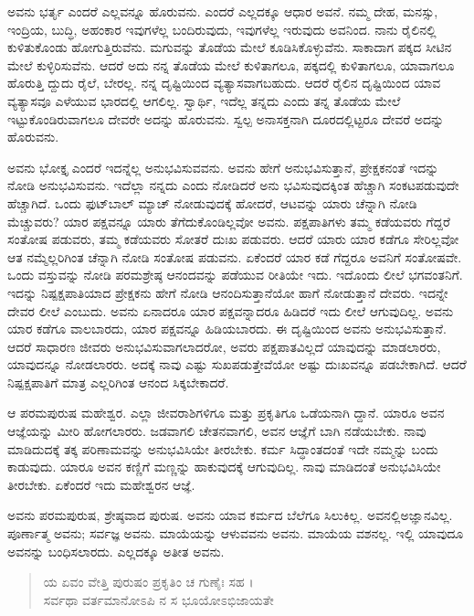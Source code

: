ಅವನು ಭರ್ತೃ ಎಂದರೆ ಎಲ್ಲವನ್ನೂ ಹೊರುವನು. ಎಂದರೆ ಎಲ್ಲದಕ್ಕೂ ಆಧಾರ ಅವನೆ. ನಮ್ಮ ದೇಹ, ಮನಸ್ಸು, ಇಂದ್ರಿಯ, ಬುದ್ಧಿ, ಅಹಂಕಾರ ಇವುಗಳೆಲ್ಲ ಬಂದಿರುವುದು, ಇವುಗಳೆಲ್ಲ ಇರುವುದು ಅವನಿಂದ. ನಾನು ರೈಲಿನಲ್ಲಿ ಕುಳಿತುಕೊಂಡು ಹೋಗುತ್ತಿರುವೆನು. ಮಗುವನ್ನು ತೊಡೆಯ ಮೇಲೆ ಕೂಡಿಸಿಕೊಳ್ಳುವೆನು. ಸಾಕಾದಾಗ ಪಕ್ಕದ ಸೀಟಿನ ಮೇಲೆ ಕುಳ್ಳಿರಿಸುವೆನು. ಆದರೆ ಅದು ನನ್ನ ತೊಡೆಯ ಮೇಲೆ ಕುಳಿತಾಗಲೂ, ಪಕ್ಕದಲ್ಲಿ ಕುಳಿತಾಗಲೂ, ಯಾವಾಗಲೂ ಹೊರುತ್ತಿ ದ್ದುದು ರೈಲೆ, ಬೇರಲ್ಲ. ನನ್ನ ದೃಷ್ಟಿಯಿಂದ ವ್ಯತ್ಯಾಸವಾಗಬಹುದು. ಆದರೆ ರೈಲಿನ ದೃಷ್ಟಿಯಿಂದ ಯಾವ ವ್ಯತ್ಯಾಸವೂ ಎಳೆಯುವ ಭಾರದಲ್ಲಿ ಆಗಲಿಲ್ಲ. ಸ್ವಾರ್ಥಿ, ಇದೆಲ್ಲ ತನ್ನದು ಎಂದು ತನ್ನ ತೊಡೆಯ ಮೇಲೆ ಇಟ್ಟುಕೊಂಡಿರುವಾಗಲೂ ದೇವರೇ ಅದನ್ನು ಹೊರುವನು. ಸ್ವಲ್ಪ ಅನಾಸಕ್ತನಾಗಿ ದೂರದಲ್ಲಿಟ್ಟರೂ ದೇವರೆ ಅದನ್ನು ಹೊರುವನು.

ಅವನು ಭೋಕ್ತೃ ಎಂದರೆ ಇದನ್ನೆಲ್ಲ ಅನುಭವಿಸುವವನು. ಅವನು ಹೇಗೆ ಅನುಭವಿಸುತ್ತಾನೆ, ಪ್ರೇಕ್ಷಕನಂತೆ ಇದನ್ನು ನೋಡಿ ಅನುಭವಿಸುವನು. ಇದೆಲ್ಲಾ ನನ್ನದು ಎಂದು ನೋಡಿದರೆ ಅನು ಭವಿಸುವುದಕ್ಕಿಂತ ಹೆಚ್ಚಾಗಿ ಸಂಕಟಪಡುವುದೇ ಹೆಚ್ಚಾಗಿದೆ. ಒಂದು ಫುಟ್​ಬಾಲ್ ಮ್ಯಾಚ್ ನೋಡುವುದಕ್ಕೆ ಹೋದರೆ, ಆಟವನ್ನು ಯಾರು ಚೆನ್ನಾಗಿ ನೋಡಿ ಮೆಚ್ಚುವರು? ಯಾರ ಪಕ್ಷವನ್ನೂ ಯಾರು ತೆಗೆದುಕೊಂಡಿಲ್ಲವೋ ಅವನು. ಪಕ್ಷಪಾತಿಗಳು ತಮ್ಮ ಕಡೆಯವರು ಗೆದ್ದರೆ ಸಂತೋಷ ಪಡುವರು, ತಮ್ಮ ಕಡೆಯವರು ಸೋತರೆ ದುಃಖ ಪಡುವರು. ಆದರೆ ಯಾರು ಯಾರ ಕಡೆಗೂ ಸೇರಿಲ್ಲವೋ ಆತ ನಮ್ಮೆಲ್ಲರಿಗಿಂತ ಚೆನ್ನಾಗಿ ನೋಡಿ ಸಂತೋಷ ಪಡುವನು. ಏಕೆಂದರೆ ಯಾರ ಕಡೆ ಗೆದ್ದರೂ ಅವನಿಗೆ ಸಂತೋಷವೇ. ಒಂದು ವಸ್ತುವನ್ನು ನೋಡಿ ಪರಮಶ್ರೇಷ್ಠ ಆನಂದವನ್ನು ಪಡೆಯುವ ರೀತಿಯೇ ಇದು. ಇದೊಂದು ಲೀಲೆ ಭಗವಂತನಿಗೆ. ಇದನ್ನು ನಿಷ್ಪಕ್ಷಪಾತಿಯಾದ ಪ್ರೇಕ್ಷಕನು ಹೇಗೆ ನೋಡಿ ಆನಂದಿಸುತ್ತಾನೆಯೋ ಹಾಗೆ ನೋಡುತ್ತಾನೆ ದೇವರು. ಇದನ್ನೇ ದೇವರ ಲೀಲೆ ಎಂಬುದು. ಅವನು ಏನಾದರೂ ಯಾರ ಪಕ್ಷವನ್ನಾದರೂ ಹಿಡಿದರೆ ಇದು ಲೀಲೆ ಆಗುವುದಿಲ್ಲ. ಅವನು ಯಾರ ಕಡೆಗೂ ವಾಲಬಾರದು, ಯಾರ ಪಕ್ಷವನ್ನೂ ಹಿಡಿಯಬಾರದು. ಈ ದೃಷ್ಟಿಯಿಂದ ಅವನು ಅನುಭವಿಸುತ್ತಾನೆ. ಆದರೆ ಸಾಧಾರಣ ಜೀವರು ಅನುಭವಿಸುವಾಗಲಾದರೋ, ಅವರು ಪಕ್ಷಪಾತವಿಲ್ಲದೆ ಯಾವುದನ್ನು ಮಾಡಲಾರರು, ಯಾವುದನ್ನೂ ನೋಡಲಾರರು. ಅದಕ್ಕೆ ನಾವು ಎಷ್ಟು ಸುಖಪಡುತ್ತೇವೆಯೋ ಅಷ್ಟು ದುಃಖವನ್ನೂ ಪಡಬೇಕಾಗಿದೆ. ಆದರೆ ನಿಷ್ಪಕ್ಷಪಾತಿಗೆ ಮಾತ್ರ ಎಲ್ಲರಿಗಿಂತ ಆನಂದ ಸಿಕ್ಕಬೇಕಾದರೆ.

ಆ ಪರಮಪುರುಷ ಮಹೇಶ್ವರ. ಎಲ್ಲಾ ಜೀವರಾಶಿಗಳಿಗೂ ಮತ್ತು ಪ್ರಕೃತಿಗೂ ಒಡೆಯನಾಗಿ ದ್ದಾನೆ. ಯಾರೂ ಅವನ ಆಜ್ಞೆಯನ್ನು ಮೀರಿ ಹೋಗಲಾರರು. ಜಡವಾಗಲಿ ಚೇತನವಾಗಲಿ, ಅವನ ಆಜ್ಞೆಗೆ ಬಾಗಿ ನಡೆಯಬೇಕು. ನಾವು ಮಾಡಿದುದಕ್ಕೆ ತಕ್ಕ ಪರಿಣಾಮವನ್ನು ಅನುಭವಿಸಿಯೇ ತೀರಬೇಕು. ಕರ್ಮ ಸಿದ್ಧಾಂತದಂತೆ ಇದೇ ನಮ್ಮನ್ನು ಬಂದು ಕಾಡುವುದು. ಯಾರೂ ಅವನ ಕಣ್ಣಿಗೆ ಮಣ್ಣನ್ನು ಹಾಕುವುದಕ್ಕೆ ಆಗುವುದಿಲ್ಲ. ನಾವು ಮಾಡಿದಂತೆ ಅನುಭವಿಸಿಯೇ ತೀರಬೇಕು. ಏಕೆಂದರೆ ಇದು ಮಹೇಶ್ವರನ ಆಜ್ಞೆ.

ಅವನು ಪರಮಪುರುಷ, ಶ್ರೇಷ್ಠವಾದ ಪುರುಷ. ಅವನು ಯಾವ ಕರ್ಮದ ಬೆಲೆಗೂ ಸಿಲುಕಿಲ್ಲ. ಅವನಲ್ಲಿಅಜ್ಞಾನವಿಲ್ಲ. ಪೂರ್ಣಾತ್ಮ ಅವನು; ಸರ್ವಜ್ಞ ಅವನು. ಮಾಯೆಯನ್ನು ಆಳುವವನು ಅವನು. ಮಾಯೆಯ ವಶನಲ್ಲ. ಇಲ್ಲಿ ಯಾವುದೂ ಅವನನ್ನು ಬಂಧಿಸಲಾರದು. ಎಲ್ಲದಕ್ಕೂ ಅತೀತ ಅವನು.

\begin{verse}
ಯ ಏವಂ ವೇತ್ತಿ ಪುರುಷಂ ಪ್ರಕೃತಿಂ ಚ ಗುಣೈಃ ಸಹ ।\\ಸರ್ವಥಾ ವರ್ತಮಾನೋಽಪಿ ನ ಸ ಭೂಯೋಽಭಿಜಾಯತೇ
\end{verse}

